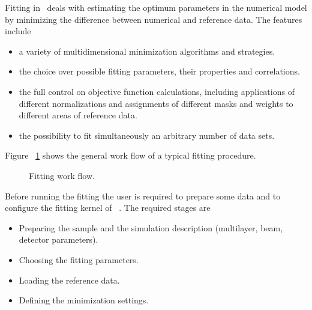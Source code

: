 Fitting in  \BornAgain\ deals with estimating the optimum parameters
in the numerical model by minimizing the difference between
numerical and reference data.
The features include

\begin{itemize}
\item a variety of multidimensional minimization algorithms and strategies.
\item the choice over possible fitting parameters, their properties and correlations.
\item the full control on objective function calculations, including applications of different normalizations and assignments of different masks and weights to different areas of reference data.
\item the possibility to fit simultaneously an arbitrary number of data sets.
\end{itemize}

Figure ~\ref{fig:minimization_workflow} shows the general work flow of a typical fitting procedure.
\begin{figure}[htbp]
\centering
\caption{
Fitting work flow.
}
\label{fig:minimization_workflow}
\end{figure}

Before running the fitting the user is required to prepare some  data and to
configure the fitting kernel of \BornAgain\ . The required stages are

\begin{itemize}
\item Preparing the sample and the simulation description (multilayer, beam, detector parameters).
\item Choosing the fitting parameters.
\item Loading the reference data.
\item Defining the minimization settings.
\end{itemize}

